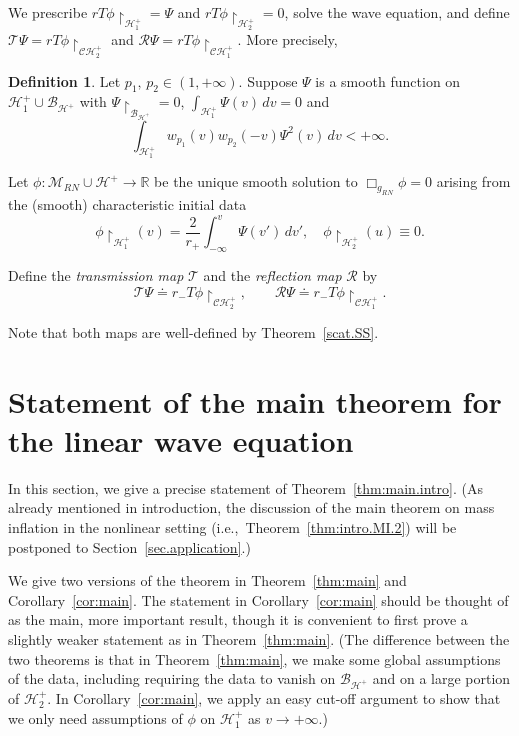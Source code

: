 \documentclass[10pt, reqno]{amsart}
\theoremstyle{definition}
\newtheorem{definition}[theorem]{Definition}
\theoremstyle{remark}
\numberwithin{equation}{section}
\newcommand{\0}{\emptyset}
\newcommand{\calC}{\mathcal C}
\newcommand{\calH}{\mathcal H}
\newcommand{\f}{\frac}
\newcommand{\CH}{\calC \calH^{+}}		%
\newcommand{\EH}{\calH^{+}}
\begin{document}
We prescribe $rT\phi\restriction_{\EH_1} = \Psi$ and $rT\phi\restriction_{\EH_2} = 0$, solve the wave equation, and define $\mathcal T\Psi = r T\phi\restriction_{\CH_2}$ and $\mathcal R\Psi = r T\phi\restriction_{\CH_1}$. More precisely, 
\begin{definition}\label{def:TR}
Let $p_1,\,p_2\in (1,+\infty)$. Suppose $\Psi$ is a smooth function on $\EH_1\cup \mathcal B_{\EH}$ with $\Psi\restriction_{\mathcal B_{\EH}} = 0$, $\int_{\EH_1} \Psi(v) \, dv = 0$ and 
$$\int_{\EH_1} w_{p_1}(v) w_{p_2}(-v) \Psi^2(v) \, dv <+\infty.$$

Let $\phi: \mathcal M_{RN} \cup \EH\to \mathbb R$ be the unique smooth solution to $\Box_{g_{RN}}\phi = 0$ arising from the (smooth) characteristic initial data
$$\phi \restriction_{\EH_1}(v) = \f {2}{r_+} \int_{-\infty}^v \Psi(v') \,dv' ,\quad \phi\restriction_{\EH_2}(u) \equiv 0.$$


Define the  \emph{transmission map} $\mathcal T$ and the \emph{reflection map} $\mathcal R$ by
\begin{equation}\label{eq:def.transmission.reflection}
\mathcal T \Psi  \doteq  r_- T\phi\restriction_{\CH_2},\qquad \mathcal R\Psi \doteq r_- T\phi\restriction_{\CH_1}.
\end{equation}

Note that both maps are well-defined by Theorem~\ref{scat.SS}. 
\end{definition}



\section{Statement of the main theorem for the linear wave equation}\label{sec:thm}

In this section, we give a precise statement of Theorem~\ref{thm:main.intro}. (As already mentioned in introduction, the discussion of the main theorem on mass inflation in the nonlinear setting (i.e.,~Theorem~\ref{thm:intro.MI.2}) will be postponed to Section~\ref{sec.application}.)

We give two versions of the theorem in Theorem~\ref{thm:main} and Corollary~\ref{cor:main}. The statement in Corollary~\ref{cor:main} should be thought of as the main, more important result, though it is convenient to first prove a slightly weaker statement as in Theorem~\ref{thm:main}. (The difference between the two theorems is that in Theorem~\ref{thm:main}, we make some global assumptions of the data, including requiring the data to vanish on $\mathcal B_{\EH}$ and on a large portion of $\EH_2$. In Corollary~\ref{cor:main}, we apply an easy cut-off argument to show that we only need assumptions of $\phi$ on $\EH_1$ as $v\to +\infty$.)
\end{document}

